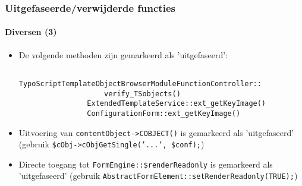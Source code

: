 \begin{frame}[fragile]
	\frametitle{Uitgefaseerde/verwijderde functies}
	\framesubtitle{Diversen (3)}

	\begin{itemize}
		\item De volgende methoden zijn gemarkeerd als 'uitgefaseerd':

			\begin{lstlisting}
				TypoScriptTemplateObjectBrowserModuleFunctionController::
				    verify_TSobjects()
				ExtendedTemplateService::ext_getKeyImage()
				ConfigurationForm::ext_getKeyImage()
			\end{lstlisting}

 		\item Uitvoering van \texttt{contentObject->COBJECT()} is gemarkeerd als 'uitgefaseerd'\newline
 			\small(gebruik \texttt{\$cObj->cObjGetSingle('...', \$conf);})\normalsize
 
		\item Directe toegang tot \texttt{FormEngine::\$renderReadonly} is gemarkeerd als 'uitgefaseerd'\newline
			\small(gebruik \texttt{AbstractFormElement::setRenderReadonly(TRUE);})\normalsize
 
	\end{itemize}

\end{frame}


